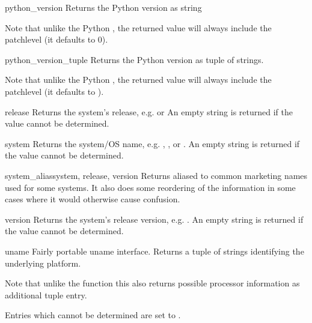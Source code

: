 \begin{funcdesc}{python_version}{}
  Returns the Python version as string 

  Note that unlike the Python , the returned value
  will always include the patchlevel (it defaults to 0).
\end{funcdesc}

\begin{funcdesc}{python_version_tuple}{}
  Returns the Python version as tuple  of strings.

  Note that unlike the Python , the returned value
  will always include the patchlevel (it defaults to ).
\end{funcdesc}

\begin{funcdesc}{release}{}
  Returns the system's release, e.g.  or 
  An empty string is returned if the value cannot be determined.
\end{funcdesc}

\begin{funcdesc}{system}{}
  Returns the system/OS name, e.g. , ,
  or .
  An empty string is returned if the value cannot be determined.
\end{funcdesc}

\begin{funcdesc}{system_alias}{system, release, version}
  Returns  aliased
  to common marketing names used for some systems.  It also does some
  reordering of the information in some cases where it would otherwise
  cause confusion.
\end{funcdesc}

\begin{funcdesc}{version}{}
  Returns the system's release version, e.g. .
  An empty string is returned if the value cannot be determined.
\end{funcdesc}

\begin{funcdesc}{uname}{}
  Fairly portable uname interface. Returns a tuple of strings
   identifying the underlying
  platform.

  Note that unlike the  function this also returns
  possible processor information as additional tuple entry.

  Entries which cannot be determined are set to .
\end{funcdesc}


